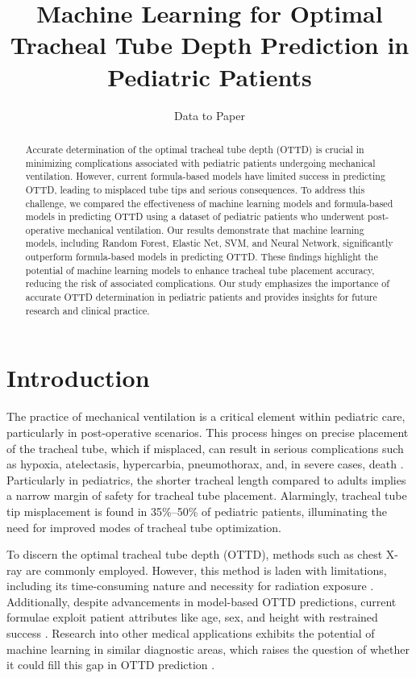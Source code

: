 \documentclass[11pt]{article}
\title{Machine Learning for Optimal Tracheal Tube Depth Prediction in Pediatric Patients}
\author{Data to Paper}
\begin{document}
\maketitle
\begin{abstract}
Accurate determination of the optimal tracheal tube depth (OTTD) is crucial in minimizing complications associated with pediatric patients undergoing mechanical ventilation. However, current formula-based models have limited success in predicting OTTD, leading to misplaced tube tips and serious consequences. To address this challenge, we compared the effectiveness of machine learning models and formula-based models in predicting OTTD using a dataset of pediatric patients who underwent post-operative mechanical ventilation. Our results demonstrate that machine learning models, including Random Forest, Elastic Net, SVM, and Neural Network, significantly outperform formula-based models in predicting OTTD. These findings highlight the potential of machine learning models to enhance tracheal tube placement accuracy, reducing the risk of associated complications. Our study emphasizes the importance of accurate OTTD determination in pediatric patients and provides insights for future research and clinical practice.
\end{abstract}
\section*{Introduction}

The practice of mechanical ventilation is a critical element within pediatric care, particularly in post-operative scenarios. This process hinges on precise placement of the tracheal tube, which if misplaced, can result in serious complications such as hypoxia, atelectasis, hypercarbia, pneumothorax, and, in severe cases, death \cite{Kerrey2009APC, Rey2009MechanicalCD}. Particularly in pediatrics, the shorter tracheal length compared to adults implies a narrow margin of safety for tracheal tube placement. Alarmingly, tracheal tube tip misplacement is found in 35\%–50\% of pediatric patients, illuminating the need for improved modes of tracheal tube optimization.

To discern the optimal tracheal tube depth (OTTD), methods such as chest X-ray are commonly employed. However, this method is laden with limitations, including its time-consuming nature and necessity for radiation exposure \cite{Yu2011OptimalTP}. Additionally, despite advancements in model-based OTTD predictions, current formulae exploit patient attributes like age, sex, and height with restrained success \cite{Jack2012InlineFR}. Research into other medical applications exhibits the potential of machine learning in similar diagnostic areas, which raises the question of whether it could fill this gap in OTTD prediction \cite{Crowson2021MachineLF, Crowson2022HumanVM}.
\end{document}
